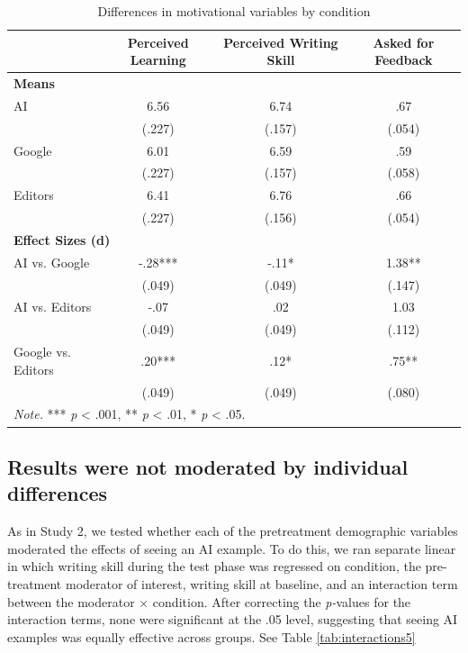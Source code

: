 \documentclass[11pt]{report}
\begin{document}
\begin{append}
\begin{table}[]
    \centering
        \caption{Differences in motivational variables by condition}

    \begin{tabular}{lccc}
\toprule
  & Perceived Learning & Perceived Writing Skill & Asked for Feedback \\ 
\midrule
\multicolumn{4}{l}{\textbf{Means}} \\[2.5pt] 
\midrule
{AI} & {6.56} & {6.74} & {.67} \\ 
{} & {(.227)} & {(.157)} & {(.054)} \\ 
{Google} & {6.01} & {6.59} & {.59} \\ 
{} & {(.227)} & {(.157)} & {(.058)} \\ 
{Editors} & {6.41} & {6.76} & {.66} \\ 
{} & {(.227)} & {(.156)} & {(.054)} \\ 
\midrule
\multicolumn{4}{l}{\textbf{Effect Sizes (d)}} \\[2.5pt] 
\midrule
{AI vs. Google} & {-.28***} & {-.11*} & {1.38**} \\ 
{} & {(.049)} & {(.049)} & {(.147)} \\ 
{AI vs. Editors} & {-.07} & {.02} & {1.03} \\ 
{} & {(.049)} & {(.049)} & {(.112)} \\ 
{Google vs. Editors} & {.20***} & {.12*} & {.75**} \\ 
{} & {(.049)} & {(.049)} & {(.080)} \\ 
\midrule
\multicolumn{4}{l}{\textit{Note.} *** \textit{p} < .001, ** \textit{p} < .01, * \textit{p} < .05.}
\vspace{5pt}
\end{tabular}
    \label{tab:motivation5}
\end{table}

\subsection{Results were not moderated by individual differences}
As in Study 2, we tested whether each of the pretreatment demographic variables moderated the effects of seeing an AI example. To do this, we ran separate linear in which writing skill during the test phase was regressed on condition, the pre-treatment moderator of interest, writing skill at baseline, and an interaction term between the moderator $\times$ condition. After correcting the \textit{p-}values for the interaction terms, none were significant at the .05 level, suggesting that seeing AI examples was equally effective across groups. See Table \ref{tab:interactions5}


\end{append}
\end{document}
